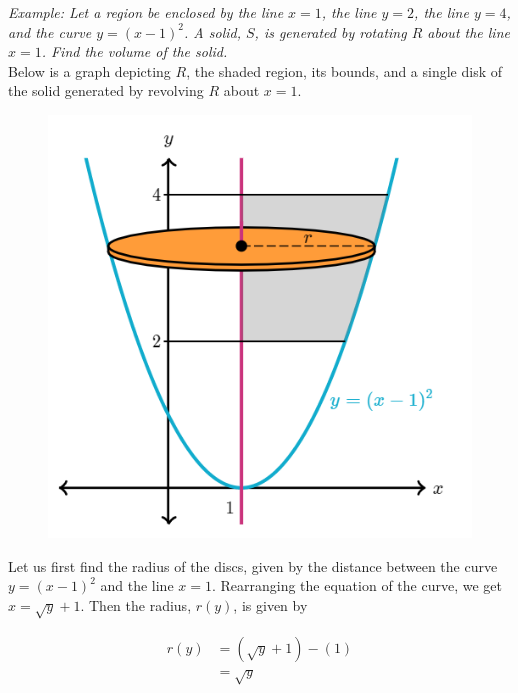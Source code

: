         \noindent \color{blue} \textit{Example: Let a region be enclosed by the line
        $x=1$, the line $y=2$, the line $y=4$, and the curve $y=(x-1)^2$. A solid, $S$, is generated
        by rotating $R$ about the line $x=1$. Find the volume of the solid.} \color{black} \\

        \noindent Below is a graph depicting $R$, the shaded region, its bounds, and a single
        disk of the solid generated by revolving $R$ about $x=1$.

        \begin{figure}[hbt!]
            \centering
            \includegraphics[scale=0.75]{Resources/Unit5IntegrationApps/Disc3}
        \end{figure}

        \noindent Let us first find the radius of the discs, given by the distance between the
        curve $y=(x-1)^2$ and the line $x=1$. Rearranging the equation of the curve, we get
        $x=\sqrt{y}+1$. Then the radius, $r(y)$, is given by

        \begin{align*}
            r(y)    &= (\sqrt{y}+1)-(1) \\
            &= \sqrt{y}
        \end{align*}

